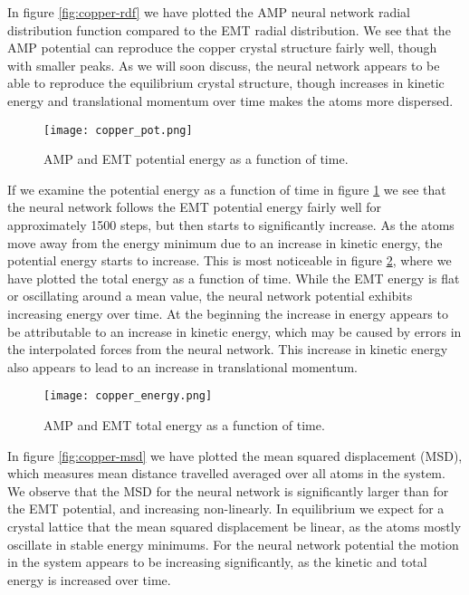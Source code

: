 In figure \ref{fig:copper-rdf} we have plotted the AMP neural network
radial distribution function compared to the EMT radial distribution.
We see that the AMP potential can reproduce the copper crystal
structure fairly well, though with smaller peaks.
As we will soon discuss, the neural network appears
to be able to reproduce the equilibrium crystal structure,
though increases in kinetic energy and translational momentum over time
makes the atoms more dispersed.

\begin{figure}[H]
    \centering
    \texttt{[image: copper\_pot.png]}
    \caption{AMP and EMT potential energy as a function of time.}
    \label{fig:copper-pot}
\end{figure}

If we examine the potential energy as a function of time
in figure \ref{fig:copper-pot} we see that the neural network
follows the EMT potential energy fairly well for approximately
1500 steps, but then starts to significantly increase.
As the atoms move away from the energy minimum due to an increase
in kinetic energy, the potential energy starts to increase.
This is most noticeable in figure \ref{fig:copper-energy},
where we have plotted the total energy as a function of time.
While the EMT energy is flat or oscillating around a mean value,
the neural network potential exhibits increasing energy over time.
At the beginning the increase in energy appears to be attributable
to an increase in kinetic energy, which may be caused by errors
in the interpolated forces from the neural network.
This increase in kinetic energy also appears to lead to an increase
in translational momentum.

\begin{figure}[H]
    \centering
    \texttt{[image: copper\_energy.png]}
    \caption{AMP and EMT total energy as a function of time.}
    \label{fig:copper-energy}
\end{figure}

In figure \ref{fig:copper-msd} we have plotted the mean squared
displacement (MSD), 
which measures mean distance travelled averaged over all atoms in the system.
We observe that the MSD for the neural network is significantly larger
than for the EMT potential, and increasing non-linearly.
In equilibrium we expect for a crystal lattice
that the mean squared displacement be linear, as the atoms
mostly oscillate in stable energy minimums.
For the neural network potential the motion in the system appears
to be increasing significantly, as the kinetic and total energy is increased
over time.

